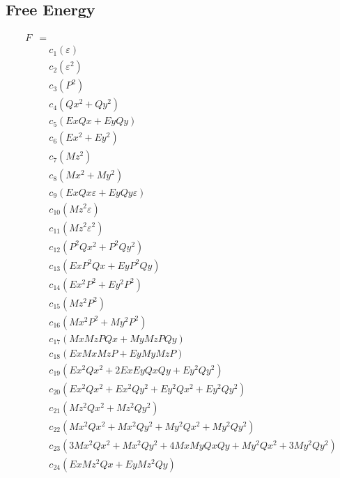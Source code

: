 \documentclass{article}
\begin{document}
\subsection*{Free Energy}

\begin{align*}
F &= \\
&\quad c_{1} \left(ε\right) \\
&\quad c_{2} \left(ε^{2}\right) \\
&\quad c_{3} \left(P^{2}\right) \\
&\quad c_{4} \left(Qx^{2} + Qy^{2}\right) \\
&\quad c_{5} \left(Ex Qx + Ey Qy\right) \\
&\quad c_{6} \left(Ex^{2} + Ey^{2}\right) \\
&\quad c_{7} \left(Mz^{2}\right) \\
&\quad c_{8} \left(Mx^{2} + My^{2}\right) \\
&\quad c_{9} \left(Ex Qx ε + Ey Qy ε\right) \\
&\quad c_{10} \left(Mz^{2} ε\right) \\
&\quad c_{11} \left(Mz^{2} ε^{2}\right) \\
&\quad c_{12} \left(P^{2} Qx^{2} + P^{2} Qy^{2}\right) \\
&\quad c_{13} \left(Ex P^{2} Qx + Ey P^{2} Qy\right) \\
&\quad c_{14} \left(Ex^{2} P^{2} + Ey^{2} P^{2}\right) \\
&\quad c_{15} \left(Mz^{2} P^{2}\right) \\
&\quad c_{16} \left(Mx^{2} P^{2} + My^{2} P^{2}\right) \\
&\quad c_{17} \left(Mx Mz P Qx + My Mz P Qy\right) \\
&\quad c_{18} \left(Ex Mx Mz P + Ey My Mz P\right) \\
&\quad c_{19} \left(Ex^{2} Qx^{2} + 2 Ex Ey Qx Qy + Ey^{2} Qy^{2}\right) \\
&\quad c_{20} \left(Ex^{2} Qx^{2} + Ex^{2} Qy^{2} + Ey^{2} Qx^{2} + Ey^{2} Qy^{2}\right) \\
&\quad c_{21} \left(Mz^{2} Qx^{2} + Mz^{2} Qy^{2}\right) \\
&\quad c_{22} \left(Mx^{2} Qx^{2} + Mx^{2} Qy^{2} + My^{2} Qx^{2} + My^{2} Qy^{2}\right) \\
&\quad c_{23} \left(3 Mx^{2} Qx^{2} + Mx^{2} Qy^{2} + 4 Mx My Qx Qy + My^{2} Qx^{2} + 3 My^{2} Qy^{2}\right) \\
&\quad c_{24} \left(Ex Mz^{2} Qx + Ey Mz^{2} Qy\right) \\

\end{align*}
\end{document}
